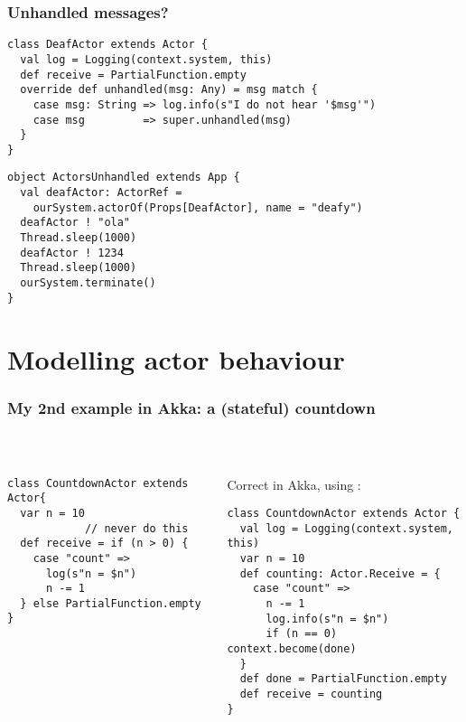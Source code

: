 \documentclass[aspectratio=169]{beamer}
\begin{document}
\begin{frame}[fragile]\frametitle{Unhandled messages?}

\begin{lstlisting}[emph={Actor, Logging, Props, ourSystem,terminate,sleep,actorOf,receive,unhandled}]
class DeafActor extends Actor {
  val log = Logging(context.system, this)
  def receive = PartialFunction.empty
  override def unhandled(msg: Any) = msg match {
    case msg: String => log.info(s"I do not hear '$msg'")
    case msg         => super.unhandled(msg)
  }
}
\end{lstlisting}
    
\begin{lstlisting}[emph={Actor, Logging, Props, ourSystem,terminate,sleep,actorOf}]
object ActorsUnhandled extends App {
  val deafActor: ActorRef =
    ourSystem.actorOf(Props[DeafActor], name = "deafy")
  deafActor ! "ola"
  Thread.sleep(1000)
  deafActor ! 1234
  Thread.sleep(1000)
  ourSystem.terminate()
}
\end{lstlisting}
\end{frame}


\section{Modelling actor behaviour}

\begin{frame}[fragile]\frametitle{My 2nd example in Akka: a (stateful) countdown}
~\\[-6mm]
\begin{columns}
\begin{column}{0.48\textwidth}
\begin{lstlisting}[emph={Actor, Logging, Props, ourSystem,terminate,sleep,actorOf,receive}]
class CountdownActor extends Actor{
  var n = 10
            // never do this
  def receive = if (n > 0) {
    case "count" =>
      log(s"n = $n")
      n -= 1
  } else PartialFunction.empty
}
\end{lstlisting}
\end{column}
\begin{column}{0.52\textwidth}
\pause
\alert{Correct in Akka, using :}
\begin{lstlisting}[emph={Actor, Logging, Props, ourSystem,terminate,sleep,actorOf,receive,become}]
class CountdownActor extends Actor {
  val log = Logging(context.system, this)
  var n = 10
  def counting: Actor.Receive = {
    case "count" =>
      n -= 1
      log.info(s"n = $n")
      if (n == 0) context.become(done)
  }
  def done = PartialFunction.empty
  def receive = counting
}
\end{lstlisting}
\end{column}
\end{columns}
\end{frame}
\end{document}
